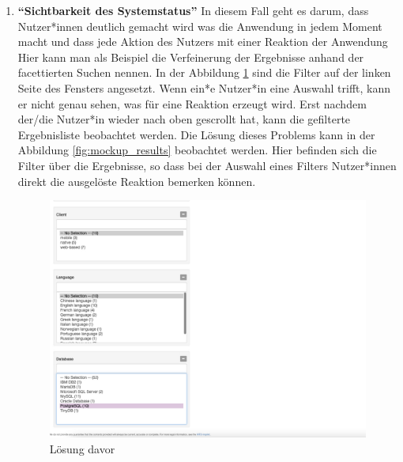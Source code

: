 \begin{enumerate}


\item \textbf{\enquote{Sichtbarkeit des Systemstatus}} \newline
In diesem Fall geht es darum, dass Nutzer*innen deutlich gemacht wird was die Anwendung in jedem Moment macht und dass jede Aktion des Nutzers mit einer Reaktion der Anwendung 
Hier kann man als Beispiel die Verfeinerung der Ergebnisse anhand der facettierten Suchen nennen.
In der Abbildung \ref{fig:point1_before} sind die Filter auf der linken Seite des Fensters angesetzt.
Wenn ein*e Nutzer*in eine Auswahl trifft, kann er nicht genau sehen, was für eine Reaktion erzeugt wird.
Erst nachdem der/die Nutzer*in wieder nach oben gescrollt hat, kann die gefilterte Ergebnisliste beobachtet werden.
Die Lösung dieses Problems kann in der Abbildung \ref{fig:mockup_results} beobachtet werden.
Hier befinden sich die Filter über die Ergebnisse, so dass bei der Auswahl eines Filters Nutzer*innen direkt die ausgelöste Reaktion bemerken können.

\begin{figure}[H]
	\centering
    	\includegraphics[width=\textwidth]{Images/Punkt_1_davor}
   	\caption{Lösung davor}
   	\label{fig:point1_before}
\end{figure}



\end{enumerate}
